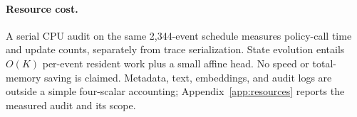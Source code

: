 \paragraph{Resource cost.}
A serial CPU audit on the same 2,344-event schedule measures policy-call time and update counts, separately from trace serialization. State evolution entails $O(K)$ per-event resident work plus a small affine head. No speed or total-memory saving is claimed. Metadata, text, embeddings, and audit logs are outside a simple four-scalar accounting; Appendix~\ref{app:resources} reports the measured audit and its scope.
